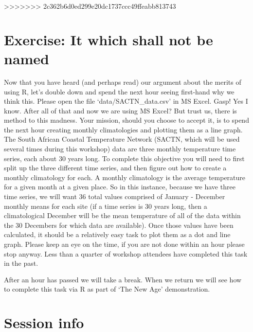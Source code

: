 \documentclass[]{book}
\newenvironment{Shaded}{\begin{snugshade}}{\end{snugshade}}
\newcommand{\KeywordTok}[1]{\textcolor[rgb]{0.13,0.29,0.53}{\textbf{#1}}}
\newcommand{\StringTok}[1]{\textcolor[rgb]{0.31,0.60,0.02}{#1}}
\newcommand{\OperatorTok}[1]{\textcolor[rgb]{0.81,0.36,0.00}{\textbf{#1}}}
\newcommand{\NormalTok}[1]{#1}
\theoremstyle{definition}
\theoremstyle{definition}
\theoremstyle{definition}
\theoremstyle{remark}
\begin{document}
>>>>>>> 2c362b6d0ed299e20dc1737ccc49ffeabb813743
\section{Exercise: It which shall not be
named}\label{exercise-it-which-shall-not-be-named}

Now that you have heard (and perhaps read) our argument about the merits
of using R, let's double down and spend the next hour seeing first-hand
why we think this. Please open the file `data/SACTN\_data.csv' in MS
Excel. Gasp! Yes I know. After all of that and now we are using MS
Excel? But trust us, there is method to this madness. Your mission,
should you choose to accept it, is to spend the next hour creating
monthly climatologies and plotting them as a line graph. The South
African Coastal Temperature Network (SACTN, which will be used several
times during this workshop) data are three monthly temperature time
series, each about 30 years long. To complete this objective you will
need to first split up the three different time series, and then figure
out how to create a monthly climatology for each. A monthly climatology
is the average temperature for a given month at a given place. So in
this instance, because we have three time series, we will want 36 total
values comprised of January - December monthly means for each site (if a
time series is 30 years long, then a climatological December will be the
mean temperature of all of the data within the 30 Decembers for which
data are available). Once those values have been calculated, it should
be a relatively easy task to plot them as a dot and line graph. Please
keep an eye on the time, if you are not done within an hour please stop
anyway. Less than a quarter of workshop attendees have completed this
task in the past.

After an hour has passed we will take a break. When we return we will
see how to complete this task via R as part of `The New Age'
demonstration.

\section{Session info}\label{session-info}

\begin{Shaded}
\end{Shaded}
\end{document}
